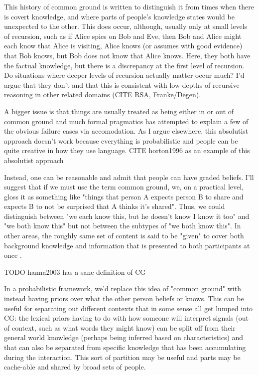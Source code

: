 \documentclass[]{article}
\begin{document}
This history of common ground is written to distinguish it from times when there is covert knowledge, and where parts of people's knowledge states would be unexpected to the other. This does occur, although, usually only at small levels of recursion, such as if Alice spies on Bob and Eve, then Bob and Alice might each know that Alice is visiting, Alice knows (or assumes with good evidence) that Bob knows, but Bob does not know that Alice knows. Here, they both have the factual knowledge, but there is a discrepancy at the first level of recursion. Do situations where deeper levels of recursion actually matter occur much? I'd argue that they don't and that this is consistent with low-depths of recursive reasoning in other related domains (CITE RSA, Franke/Degen). 

A bigger issue is that things are usually treated as being either in or out of common ground and much formal pragmatics has attempted to explain a few of the obvious failure cases via accomodation. As I argue elsewhere, this absolutist approach doesn't work because everything is probabilistic and people can be quite creative in how they use language. CITE horton1996 as an example of this absolutist approach

Instead, one can be reasonable and admit that people can have graded beliefs. I'll suggest that if we must use the term common ground, we, on a practical level, gloss it as something like "things that person A expects person B to share and expects B to not be surprised that A thinks it's shared". Thus, we could distinguish between "we each know this, but he doesn't know I know it too" and "we both know this" but not between the subtypes of "we both know this". In other areas, the roughly same set of content is said to be "given" to cover both background knowledge and information that is presented to both participants at once \cite{fay2010}. 

TODO hanna2003 has a sane definition of CG



In a probabilistic framework, we'd replace this idea of "common ground" with instead having priors over what the other person beliefs or knows. This can be useful for separating out different contexts that in some sense all get lumped into CG: the lexical priors having to do with how someone will interpret signals (out of context, such as what words they might know) can be split off from their general world knowledge (perhaps being inferred based on characteristics) and that can also be separated from specific knowledge that has been accumulating during the interaction. This sort of partition may be useful and parts may be cache-able and shared by broad sets of people. 
\end{document}
